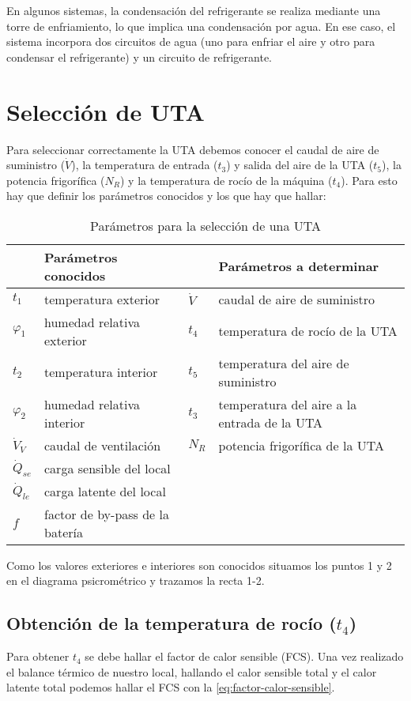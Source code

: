 En algunos sistemas, la condensación del refrigerante se realiza mediante una torre de enfriamiento, lo que implica una condensación por agua. En ese caso, el sistema incorpora dos circuitos de agua (uno para enfriar el aire y otro para condensar el refrigerante) y un circuito de refrigerante.

\section{Selecci\'on de UTA}
Para seleccionar correctamente la UTA debemos conocer el caudal de aire de suministro ($\dot{V}$), la temperatura de entrada ($t_3$) y salida del aire de la UTA ($t_5$), la potencia frigor\'ifica ($N_R$) y la temperatura de roc\'io de la m\'aquina ($t_4$). Para esto hay que definir los par\'ametros conocidos y los que hay que hallar:
\begin{table}[H]
	\centering
	\caption{Par\'ametros para la selecci\'on de una UTA}
	\label{tab:parametros-seleccion-UTA}
	\begin{tabular}{p{0.8cm} l|p{0.5cm} l}
		\hline
		&\textbf{Par\'ametros conocidos} && \textbf{Par\'ametros a determinar} \\
		\hline
		$t_1$ & temperatura exterior & $\dot{V}$ & caudal de aire de suministro \\
		$\varphi_1$ & humedad relativa exterior & $t_4$ & temperatura de roc\'io de la UTA\\
		$t_2$ & temperatura interior & $t_5$ & temperatura del aire de suministro\\
		$\varphi_2$ & humedad relativa interior & $t_3$ & temperatura del aire a la entrada de la UTA\\
		$\dot{V}_V$ & caudal de ventilaci\'on & $N_R$ & potencia frigor\'ifica de la UTA\\
		$\dot{Q}_{se}$ & carga sensible del local & &\\
		$\dot{Q}_{le}$ & carga latente del local & &\\
		$f$ & factor de by-pass de la bater\'ia & &\\
		\hline
	\end{tabular}
\end{table}
Como los valores exteriores e interiores son conocidos situamos los puntos 1 y 2 en el diagrama psicrom\'etrico y trazamos la recta 1-2.
\subsection{Obtenci\'on de la temperatura de roc\'io ($t_4$)}
Para obtener $t_4$ se debe hallar el factor de calor sensible (FCS). Una vez realizado el balance t\'ermico de nuestro local, hallando el calor sensible total y el calor latente total podemos hallar el FCS con la \autoref{eq:factor-calor-sensible}.



